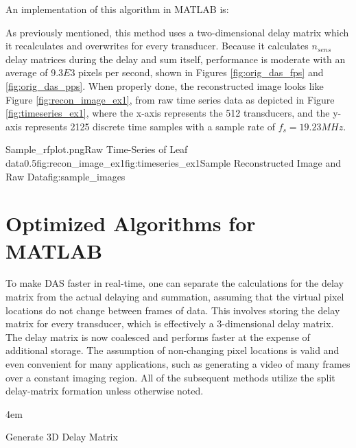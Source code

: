     An implementation of this algorithm in MATLAB is:

    


    As previously mentioned, this method uses a two-dimensional delay matrix which it recalculates and overwrites for every transducer. Because it calculates $n_{sens}$ delay matrices during the delay and sum itself, performance is moderate with an average of $9.3E3$ pixels per second, shown in Figures \ref{fig:orig_das_fps} and \ref{fig:orig_das_pps}. When properly done, the reconstructed image looks like Figure \ref{fig:recon_image_ex1}, from raw time series data as depicted in Figure \ref{fig:timeseries_ex1}, where the x-axis represents the 512 transducers, and the y-axis represents 2125 discrete time samples with a sample rate of $f_s = 19.23 MHz$.

    {Sample_rfplot.png}{Raw Time-Series of Leaf data}{0.5}{fig:recon_image_ex1}{fig:timeseries_ex1}{Sample Reconstructed Image and Raw Data}{fig:sample_images}

\section{Optimized Algorithms for MATLAB}
\label{chapter3:optimized_matlab}

    To make DAS faster in real-time, one can separate the calculations for the delay matrix from the actual delaying and summation, assuming that the virtual pixel locations do not change between frames of data. This involves storing the delay matrix for every transducer, which is effectively a 3-dimensional delay matrix. The delay matrix is now coalesced and performs faster at the expense of additional storage. The assumption of non-changing pixel locations is valid and even convenient for many applications, such as generating a video of many frames over a constant imaging region. All of the subsequent methods utilize the split delay-matrix formation unless otherwise noted.

    \begin{algorithm} [H]
        \parindent4em
        \normalem
        \caption{Generate 3D Delay Matrix}\label{algo:3d_indmat}
        \end{algorithm}

